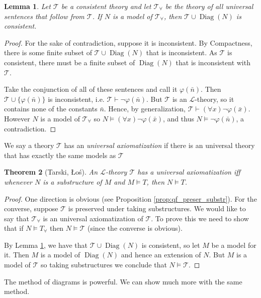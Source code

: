 \documentclass{report}
\DeclareMathOperator{\Diag}{Diag}
\theoremstyle{definition}
\theoremstyle{plain}
\newtheorem{thm}{Theorem}[section]
\newtheorem{lem}[thm]{Lemma}
\theoremstyle{definition}
\begin{document}
 		\begin{lem}\label{lem:uni_consis_diag}
 			Let $\mathcal{T}$ be a consistent theory and let $\mathcal{T}_{\forall}$ be the theory of all universal sentences that follow from $\mathcal{T}$. If $N$ is a model of $\mathcal{T}_{\forall}$, then $\mathcal{T}\cup \Diag(N)$ is consistent.
 		\end{lem}
 		\begin{proof}
 			For the sake of contradiction, suppose it is inconsistent. By Compactness, there is some finite subset of $\mathcal{T}\cup \Diag(N)$ that is inconsistent. As $\mathcal{T}$ is consistent, there must be a finite subset of $\Diag(N)$ that is inconsistent with $\mathcal{T}$.
 			
 			Take the conjunction of all of these sentences and call it $\varphi(\bar{n})$. Then $\mathcal{T}\cup\{\varphi(\bar{n})\}$ is inconsistent, i.e. $\mathcal{T}\vdash \neg \varphi(\bar{n})$. But $\mathcal{T}$ is an $\mathcal{L}$-theory, so it contains none of the constants $\bar{n}$. Hence, by generalization, $\mathcal{T} \vdash (\forall x)\neg \varphi(\bar{x})$. However $N$ is a model of $\mathcal{T}_{\forall}$ so $N \models (\forall x)\neg \varphi(\bar{x})$, and thus $N \models \neg \varphi(\bar{n})$, a contradiction.
 		\end{proof}
 		We say a theory $\mathcal{T}$ has an \emph{universal axiomatization} if there is an universal theory that has exactly the same models as $\mathcal{T}$
 		\begin{thm}[Tarski, \L o\'s]
 			An $\mathcal{L}$-theory $\mathcal{T}$ has a universal axiomatization iff whenever $N$ is a substructure of $M$ and $M \models T$, then $N \models T$.
 		\end{thm}
 		\begin{proof}
 			One direction is obvious (see Proposition \ref{prop:qf_preser_substr}). For the converse, suppose $\mathcal{T}$ is preserved under taking substructures. We would like to say that $\mathcal{T}_{\forall}$ is an universal axiomatization of $\mathcal{T}$. To prove this we need to show that if $N \models T_{\forall}$ then $N \models\mathcal{T}$ (since the converse is obvious).
 			
 			By Lemma \ref{lem:uni_consis_diag}, we have that $\mathcal{T} \cup \Diag(N)$ is consistent, so let $M$ be a model for it. Then $M$ is a model of $\Diag(N)$ and hence an extension of $N$. But $M$ is a model of $\mathcal{T}$ so taking substructures we conclude that $N \models \mathcal{T}$.
 		\end{proof}
 		The method of diagrams is powerful. We can show much more with the same method.
\end{document}
